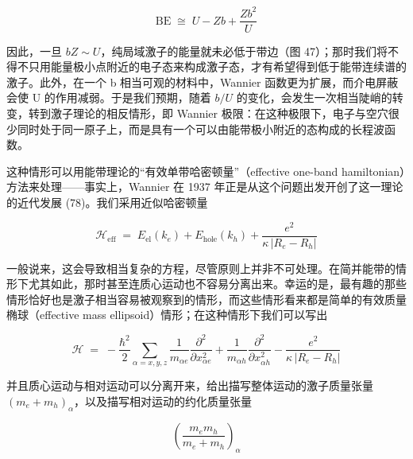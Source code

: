 \begin{equation*}
\mathrm{BE} \;\cong\; U - Zb + \frac{Zb^{2}}{U}
\end{equation*}


因此，一旦 $bZ \sim U$，纯局域激子的能量就未必低于带边（图 47）；那时我们将不得不只用能量极小点附近的电子态来构成激子态，才有希望得到低于能带连续谱的激子。此外，在一个 b 相当可观的材料中，Wannier 函数更为扩展，而介电屏蔽会使 U 的作用减弱。于是我们预期，随着 $b/U$ 的变化，会发生一次相当陡峭的转变，转到激子理论的相反情形，即 Wannier 极限：在这种极限下，电子与空穴很少同时处于同一原子上，而是具有一个可以由能带极小附近的态构成的长程波函数。


这种情形可以用能带理论的“有效单带哈密顿量”（effective one-band hamiltonian）方法来处理——事实上，Wannier 在 1937 年正是从这个问题出发开创了这一理论的近代发展 (78)。我们采用近似哈密顿量

\begin{equation*}
\mathcal{H}_{\mathrm{eff}} \;=\; E_{\mathrm{el}}(k_e) + E_{\mathrm{hole}}(k_h) + \frac{e^{2}}{\kappa\,|R_e - R_h|}
\end{equation*}

一般说来，这会导致相当复杂的方程，尽管原则上并非不可处理。在简并能带的情形下尤其如此，那时甚至连质心运动也不容易分离出来。幸运的是，最有趣的那些情形恰好也是激子相当容易被观察到的情形，而这些情形看来都是简单的有效质量椭球（effective mass ellipsoid）情形；在这种情形下我们可以写出

\begin{equation*}
\mathcal{H} \;=\; -\frac{\hbar^{2}}{2}\sum_{\alpha=x,y,z}\frac{1}{m_{\alpha e}}\frac{\partial^{2}}{\partial x_{\alpha e}^{2}} + \frac{1}{m_{\alpha h}}\frac{\partial^{2}}{\partial x_{\alpha h}^{2}} - \frac{e^{2}}{\kappa\,|R_e - R_h|}
\end{equation*}

并且质心运动与相对运动可以分离开来，给出描写整体运动的激子质量张量 $\left(m_e + m_h\right)_{\alpha}$，以及描写相对运动的约化质量张量

\begin{equation*}
\left(\frac{m_e m_h}{m_e + m_h}\right)_{\alpha}
\end{equation*}

